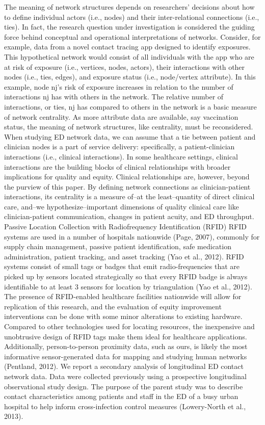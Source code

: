 \documentclass[
]{article}
\begin{document}
The meaning of network structures depends on researchers' decisions
about how to define individual actors (i.e., nodes) and their
inter-relational connections (i.e., ties). In fact, the research
question under investigation is considered the guiding force behind
conceptual and operational interpretations of networks. Consider, for
example, data from a novel contact tracing app designed to identify
exposures. This hypothetical network would consist of all individuals
with the app who are at risk of exposure (i.e., vertices, nodes,
actors), their interactions with other nodes (i.e., ties, edges), and
exposure status (i.e., node/vertex attribute). In this example, node
nj's risk of exposure increases in relation to the number of
interactions nj has with others in the network. The relative number of
interactions, or ties, nj has compared to others in the network is a
basic measure of network centrality. As more attribute data are
available, say vaccination status, the meaning of network structures,
like centrality, must be reconsidered. When studying ED network data, we
can assume that a tie between patient and clinician nodes is a part of
service delivery: specifically, a patient-clinician interactions (i.e.,
clinical interactions). In some healthcare settings, clinical
interactions are the building blocks of clinical relationships with
broader implications for quality and equity. Clinical relationships are,
however, beyond the purview of this paper. By defining network
connections as clinician-patient interactions, its centrality is a
measure of--at the least--quantity of direct clinical care, and--we
hypothesize--important dimensions of quality clinical care like
clinician-patient communication, changes in patient acuity, and ED
throughput. Passive Location Collection with Radiofrequency
Identification (RFID) RFID systems are used in a number of hospitals
nationwide (Page, 2007), commonly for supply chain management, passive
patient identification, safe medication administration, patient
tracking, and asset tracking (Yao et al., 2012). RFID systems consist of
small tags or badges that emit radio-frequencies that are picked up by
sensors located strategically so that every RFID badge is always
identifiable to at least 3 sensors for location by triangulation (Yao et
al., 2012). The presence of RFID-enabled healthcare facilities
nationwide will allow for replication of this research, and the
evaluation of equity improvement interventions can be done with some
minor alterations to existing hardware. Compared to other technologies
used for locating resources, the inexpensive and unobtrusive design of
RFID tags make them ideal for healthcare applications. Additionally,
person-to-person proximity data, such as ours, is likely the most
informative sensor-generated data for mapping and studying human
networks (Pentland, 2012). We report a secondary analysis of
longitudinal ED contact network data. Data were collected previously
using a prospective longitudinal observational study design. The purpose
of the parent study was to describe contact characteristics among
patients and staff in the ED of a busy urban hospital to help inform
cross-infection control measures (Lowery-North et al., 2013).
\end{document}
